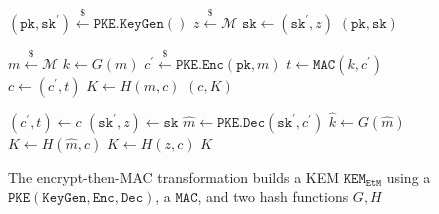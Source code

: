 \documentclass[journal=tches,submission]{iacrtrans}
\newcommand{\pke}{\texttt{PKE}}
\newcommand{\keygen}{\texttt{KeyGen}}
\newcommand{\encrypt}{\texttt{Enc}}
\newcommand{\decrypt}{\texttt{Dec}}
\newcommand{\kem}{\texttt{KEM}}
\newcommand{\encap}{\texttt{Encap}}
\newcommand{\decap}{\texttt{Decap}}
\newcommand{\etm}{\texttt{EtM}}  %
\newcommand{\mac}{\texttt{MAC}}
\newcommand{\pk}{\texttt{pk}}
\newcommand{\sk}{\texttt{sk}}
\newcommand{\leftsample}{\stackrel{\$}{\leftarrow}}
\begin{document}
\begin{figure}[h]
    \centering
    \begin{minipage}[t]{0.5\textwidth}
        \begin{algorithm}[H]
            \caption*{$\kem_\etm.\keygen()$}
            \begin{algorithmic}[1]
                \State $(\pk, \sk^\prime) \leftsample \pke\texttt{.}\keygen()$
                \State $z \leftsample \mathcal{M}$
                \State $\sk \leftarrow (\sk^\prime, z)$
                \State \Return $(\pk, \sk)$
            \end{algorithmic}
        \end{algorithm}
        \begin{algorithm}[H]
            \caption*{$\kem_\etm.\encap(\pk)$}
            \begin{algorithmic}[1]
                \State $m \leftsample \mathcal{M}$
                \State $k \leftarrow G(m)$
                \State $c^\prime \leftsample \pke\texttt{.}\encrypt(\pk, m)$
                \State $t \leftarrow \mac(k, c^\prime)$
                \State $c \leftarrow (c^\prime, t)$
                \State $K \leftarrow H(m, c)$
                \State \Return $(c, K)$
            \end{algorithmic}
        \end{algorithm}
    \end{minipage}\hfill
    \begin{minipage}[t]{0.49\textwidth}
        \begin{algorithm}[H]
            \caption*{$\kem_\etm.\decap(\sk, c)$}
            \begin{algorithmic}[1]
                \State $(c^\prime, t) \leftarrow c$
                \State $(\sk^\prime, z) \leftarrow \sk$
                \State $\hat{m} \leftarrow \pke\texttt{.}\decrypt(\sk^\prime, c^\prime)$
                \State $\hat{k} \leftarrow G(\hat{m})$
                \If{$\mac(\hat{k}, c^\prime) = t$}
                    \State $K \leftarrow H(\hat{m}, c)$
                \Else
                    \State $K \leftarrow H(z, c)$
                \EndIf
                \State \Return $K$
            \end{algorithmic}
        \end{algorithm}
    \end{minipage}
    \caption{The encrypt-then-MAC transformation builds a KEM $\kem_\etm$ using a $\pke(\keygen, \encrypt, \decrypt)$, a $\mac$, and two hash functions $G, H$}\label{fig:etm-routines} 
\end{figure}
\end{document}
